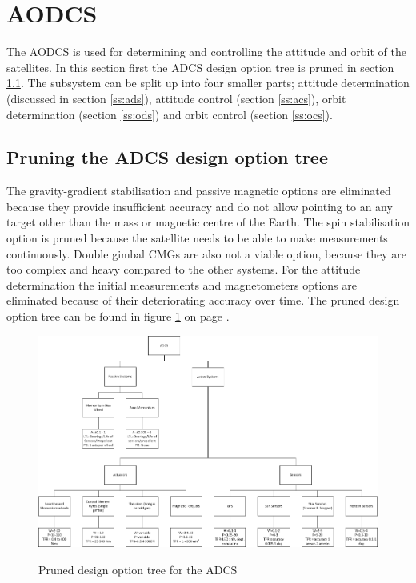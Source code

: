 \section{\ac{AODCS}}
The \ac{AODCS} is used for determining and controlling the attitude and orbit of the satellites. In this section first the \ac{ADCS} design option tree is pruned in section \ref{pruneADCS}. The subsystem can be split up into four smaller parts; attitude determination (discussed in section \ref{ss:ads}), attitude control (section \ref{ss:acs}), orbit determination (section \ref{ss:ods}) and orbit control (section \ref{ss:ocs}). 

\subsection{Pruning the \acs{ADCS} design option tree}
\label{pruneADCS}
The gravity-gradient stabilisation and passive magnetic options are eliminated because they provide insufficient accuracy and do not allow pointing to an any target other than the mass or magnetic centre of the Earth. The spin stabilisation option is pruned because the satellite needs to be able to make measurements continuously. Double gimbal \acp{CMG} are also not a viable option, because they are too complex and heavy compared to the other systems.
For the attitude determination the initial measurements and magnetometers options are eliminated because of their deteriorating accuracy over time.
The pruned design option tree can be found in figure \ref{fig:pruneADCS} on page \pageref{fig:pruneADCS}.

\begin{figure}
\centering
\includegraphics[width=1.0\textwidth, angle=90]{chapters/img/prunedADCStree.png}
\label{fig:pruneADCS}
\caption{Pruned design option tree for the \acs{ADCS}}
\end{figure}

